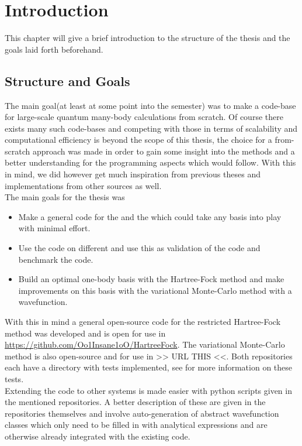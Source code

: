\chapter{Introduction\label{chapter:1}}
    This chapter will give a brief introduction to the structure of the thesis
    and the goals laid forth beforehand.

\section{Structure and Goals\label{sec:structure_and_goals}}
    The main goal(at least at some point into the semester) was to make a
    code-base for large-scale quantum many-body calculations from scratch. Of
    course there exists many such code-bases and competing with those in terms
    of scalability and computational efficiency is beyond the scope of this
    thesis, the choice for a from-scratch approach was made in order to gain
    some insight into the methods and a better understanding for the
    programming aspects which would follow. With this in mind, we did however
    get much inspiration from previous theses and implementations from other
    sources as well. \\
    The main goals for the thesis was
        \begin{itemize}
            \item Make a general \CC code for the 
                and the  which could take
                any basis into play with minimal effort.
            \item Use the \CC code on different  and use this as validation of the code and
                benchmark the code.
            \item Build an optimal one-body basis with the Hartree-Fock method
                and make improvements on this basis with the variational
                Monte-Carlo method with a  wavefunction.
        \end{itemize}
    With this in mind a general open-source code for the restricted
    Hartree-Fock method was developed and is open for use in
    \url{https://github.com/Oo1Insane1oO/HartreeFock}. The variational
    Monte-Carlo method is also open-source and for use in >> URL THIS <<. Both
    repositories each have a directory with tests implemented, see
     for more information on these tests. \\
    Extending the code to other systems is made easier with python scripts
    given in the mentioned repositories. A better description of these are
    given in the repositories themselves and involve auto-generation of
    abstract wavefunction classes which only need to be filled in with
    analytical expressions and are otherwise already integrated with the
    existing code.
